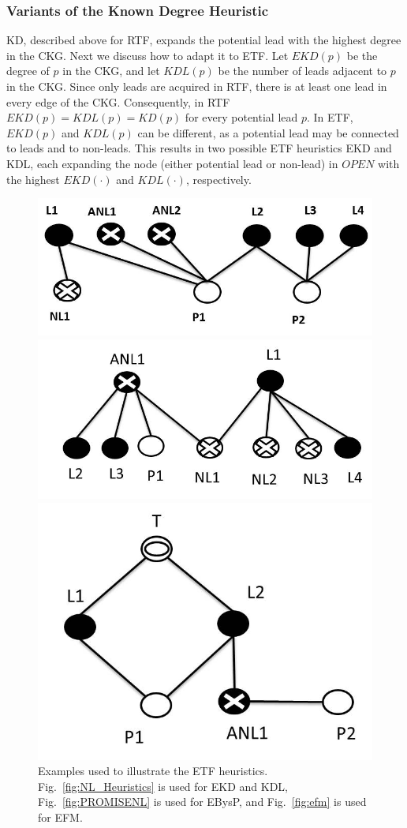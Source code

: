 \documentclass[journal]{IEEEtran}
\begin{document}
\subsubsection{Variants of the Known Degree Heuristic}
KD, described above for RTF, expands the potential lead with the highest degree
in the CKG.
Next we discuss how to adapt it to ETF. Let $EKD(p)$ be the degree of $p$ in the
CKG, and let $KDL(p)$  be the number of leads adjacent to $p$ in the CKG.
Since only leads are acquired in RTF, there is at least one lead in every edge
of the CKG. Consequently, in RTF $EKD(p)=KDL(p)=KD(p)$ for every potential lead $p$.
In ETF, $EKD(p)$ and $KDL(p)$ can be different, as a potential lead may be connected to leads and to non-leads. This results in two possible ETF heuristics EKD and KDL, each expanding the node (either potential lead or
non-lead) in $OPEN$ with the highest $EKD(\cdot)$ and $KDL(\cdot)$, respectively.






\begin{figure}[t]
\centering
\begin{subfloat}[\label{fig:NL_Heuristics}]
\centering
\includegraphics[width=.35\textwidth]{NL_BASE.jpg}
\end{subfloat}%
\begin{subfloat}[\label{fig:PROMISENL}]
  \centering
\includegraphics[width=.35\textwidth]{PROMISENL.jpg}
\end{subfloat}%
\begin{subfloat}[\label{fig:efm}]
  \centering
\includegraphics[width=.25\textwidth]{fm.jpg}
\end{subfloat}%

\caption{Examples used to illustrate the ETF heuristics.  Fig.~\ref{fig:NL_Heuristics} is used for EKD and KDL, 
Fig.~\ref{fig:PROMISENL} is used for EBysP,
and Fig.~\ref{fig:efm} is used for EFM.}
\label{fig:efm-and-ebysp}

\end{figure}
\end{document}
